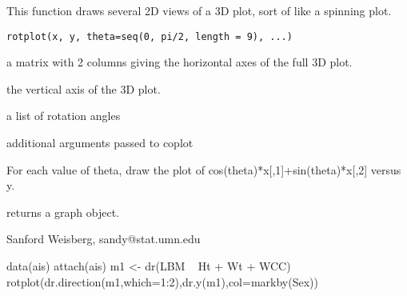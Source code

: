 \begin{Description}\relax
This function draws several 2D views of a 3D plot, sort of like a spinning
plot.\end{Description}
\begin{Usage}
\begin{verbatim}
rotplot(x, y, theta=seq(0, pi/2, length = 9), ...)
\end{verbatim}
\end{Usage}
\begin{Arguments}
\begin{ldescription}
\item[\code{x}] a matrix with 2 columns giving the horizontal axes of the full 3D
plot.
\item[\code{y}] the vertical axis of the 3D plot.
\item[\code{theta}] a list of rotation angles
\item[\code{...}] additional arguments passed to coplot
\end{ldescription}
\end{Arguments}
\begin{Details}\relax
For each value of theta, draw the plot of cos(theta)*x[,1]+sin(theta)*x[,2]
versus y.\end{Details}
\begin{Value}
returns a graph object.\end{Value}
\begin{Author}\relax
Sanford Weisberg, sandy@stat.umn.edu\end{Author}
\begin{Examples}
\begin{ExampleCode}
 data(ais)
 attach(ais)
 m1 <- dr(LBM ~ Ht + Wt + WCC)  
 rotplot(dr.direction(m1,which=1:2),dr.y(m1),col=markby(Sex))
  \end{ExampleCode}
\end{Examples}

